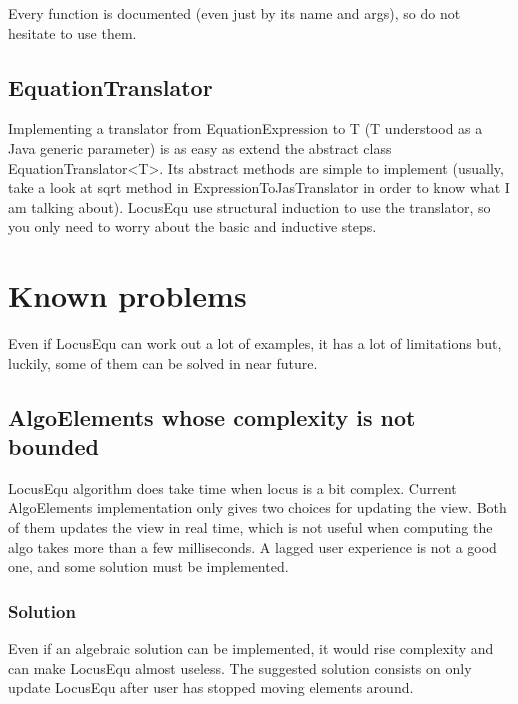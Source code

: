 \documentclass[12pt, oneside, a4paper]{article}
\begin{document}
Every function is documented (even just by its name and args), so do
not hesitate to use them.

\subsection{EquationTranslator}

Implementing a translator from EquationExpression to T (T understood
as a Java generic parameter) is as easy as extend the abstract class
EquationTranslator<T>. Its abstract methods are simple to implement
(usually, take a look at sqrt method in ExpressionToJasTranslator in
order to know what I am talking about). LocusEqu use structural
induction to use the translator, so you only need to worry about the
basic and inductive steps.

\section{Known problems}

Even if LocusEqu can work out a lot of examples, it has a lot of
limitations but, luckily, some of them can be solved in near future.\\

\subsection{AlgoElements whose complexity is not bounded}

LocusEqu algorithm does take time when locus is a bit complex. Current
AlgoElements implementation only gives two choices for updating the
view. Both of them updates the view in real time, which is not useful
when computing the algo takes more than a few milliseconds. A lagged
user experience is not a good one, and some solution must be
implemented.

\subsubsection{Solution}

Even if an algebraic solution can be implemented, it would rise
complexity and can make LocusEqu almost useless. The suggested
solution consists on only update LocusEqu after user has stopped
moving elements around.
\end{document}
